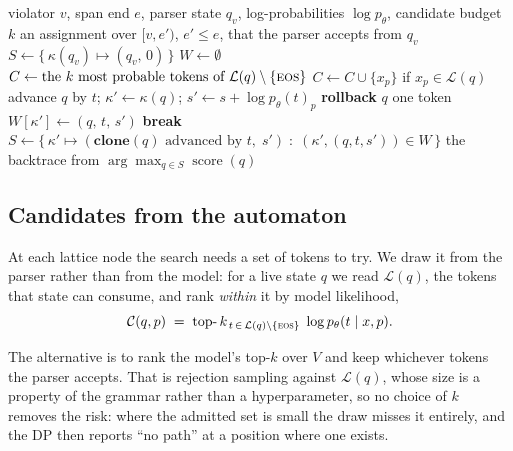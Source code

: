 \documentclass{article}
\begin{document}
\begin{algorithm}[t]
\caption{Joint repair of a violated span}
\label{alg:dp}
\begin{algorithmic}[1]
\Require violator $v$, span end $e$, parser state $q_v$, log-probabilities
$\log p_\theta$, candidate budget $k$
\Ensure an assignment over $[v,e')$, $e'\!\le\!e$, that the parser accepts from $q_v$
\State $S \gets \{\,\kappa(q_v)\mapsto(q_v,\,0)\,\}$ 
  \State $W \gets \emptyset$ 
    \State $C \gets \text{the } k \text{ most probable tokens of } \mathcal{L}(q)\setminus\{\textsc{eos}\}$ \Comment{\S\ref{sec:cand}}
    \State $C \gets C \cup \{x_p\}$ if $x_p \in \mathcal{L}(q)$ 
      \State advance $q$ by $t$; \; $\kappa' \gets \kappa(q)$; \; $s' \gets s + \log p_\theta(t)_p$
      \State \textbf{rollback} $q$ one token 
        \State $W[\kappa'] \gets (q,\,t,\,s')$ 
      \EndIf
    \EndFor
  \EndFor
    \State \textbf{break} 
  \EndIf
  \State $S \gets \{\,\kappa' \mapsto (\textbf{clone}(q)\text{ advanced by }t,\; s') \;:\; (\kappa',(q,t,s')) \in W\,\}$
\EndFor
\State \Return the backtrace from $\arg\max_{q\in S}\operatorname{score}(q)$
\end{algorithmic}
\end{algorithm}

\subsection{Candidates from the automaton}
\label{sec:cand}

At each lattice node the search needs a set of tokens to try. We draw it from
the parser rather than from the model: for a live state $q$ we read
$\mathcal{L}(q)$, the tokens that state can consume, and rank \emph{within} it
by model likelihood,
\begin{equation}
\label{eq:cand}
\mathcal{C}(q,p) \;=\; \operatorname*{top-}k_{\,t\,\in\,\mathcal{L}(q)\setminus\{\textsc{eos}\}}\; \log p_\theta(t\mid x,p).
\end{equation}

The alternative is to rank the model's top-$k$ over $V$ and keep whichever
tokens the parser accepts. That is rejection sampling against
$\mathcal{L}(q)$, whose size is a property of the grammar rather than a
hyperparameter, so no choice of $k$ removes the risk: where the admitted set is
small the draw misses it entirely, and the DP then reports ``no path'' at a
position where one exists.
\end{document}

